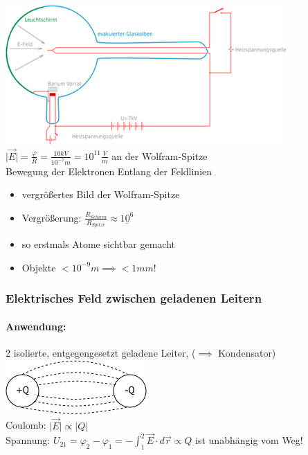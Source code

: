 \documentclass[11pt]{article}
\begin{document}
\includegraphics{skizzen/14/14_8B3}\\

$ \vert\vec{E}\vert = \frac{\varphi}{R}= \frac{10kV}{10^{-7}m} = 10^11\frac{V}{m} $ an der Wolfram-Spitze\\
Bewegung der Elektronen Entlang der Feldlinien\\
\begin{itemize}
	\item vergrö\ss{}ertes Bild der Wolfram-Spitze\\
	\item Vergrö\ss{}erung: $\frac{R_{Schirm}}{R_{Spitze}}\approx \underline{10^6}$
	\item so erstmals Atome sichtbar gemacht
	\item Objekte $<10^{-9}m \implies <1mm!$
\end{itemize}

\subsubsection{Elektrisches Feld zwischen geladenen Leitern}

\paragraph{Anwendung:}2 isolierte, entgegengesetzt geladene Leiter, ($\implies$ Kondensator)
\hfill\\

\includegraphics{skizzen/14/14_8B4}\\

Coulomb: $\vert\vec{E}\vert\propto\vert Q\vert$\\
Spannung: $ U_{21}=\varphi_2-\varphi_1 = -\displaystyle\int_{1}^{2} \vec{E}\cdot d\vec{r}\propto Q $ ist unabhängig vom Weg!\\
\end{document}
